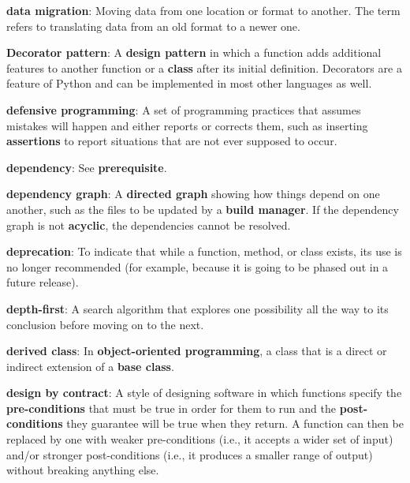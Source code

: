 \documentclass[krantzl]{krantz}
\newcommand{\glosskey}[1]{\textbf{#1}}
\begin{document}
\noindent \textbf{{\newline}\glosskey{data migration}}: 
Moving data from one location or format to another. The term refers to translating data from an old format to a newer one.


\noindent \textbf{{\newline}\glosskey{Decorator pattern}}: 
A \glosskey{design pattern} in which a function adds additional features to another function or a \glosskey{class} after its initial definition. Decorators are a feature of Python and can be implemented in most other languages as well.


\noindent \textbf{{\newline}\glosskey{defensive programming}}: 
A set of programming practices that assumes mistakes will happen and either reports or corrects them, such as inserting \glosskey{assertions} to report situations that are not ever supposed to occur.


\noindent \textbf{{\newline}\glosskey{dependency}}: 
See \glosskey{prerequisite}.


\noindent \textbf{{\newline}\glosskey{dependency graph}}: 
A \glosskey{directed graph} showing how things depend on one another, such as the files to be updated by a \glosskey{build manager}. If the dependency graph is not \glosskey{acyclic}, the dependencies cannot be resolved.


\noindent \textbf{{\newline}\glosskey{deprecation}}: 
To indicate that while a function, method, or class exists, its use is no longer recommended (for example, because it is going to be phased out in a future release).


\noindent \textbf{{\newline}\glosskey{depth-first}}: 
A search algorithm that explores one possibility all the way to its conclusion before moving on to the next.


\noindent \textbf{{\newline}\glosskey{derived class}}: 
In \glosskey{object-oriented programming}, a class that is a direct or indirect extension of a \glosskey{base class}.


\noindent \textbf{{\newline}\glosskey{design by contract}}: 
A style of designing software in which functions specify the \glosskey{pre-conditions} that must be true in order for them to run and the \glosskey{post-conditions} they guarantee will be true when they return. A function can then be replaced by one with weaker pre-conditions (i.e., it accepts a wider set of input) and/or stronger post-conditions (i.e., it produces a smaller range of output) without breaking anything else.
\end{document}
